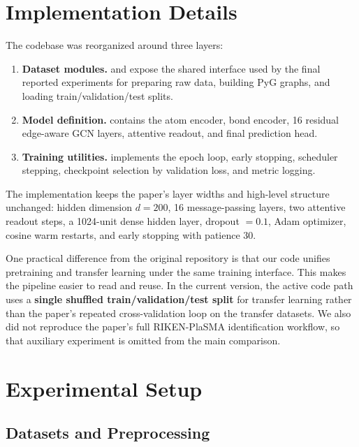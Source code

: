 \section{Implementation Details}

The codebase was reorganized around three layers:

\begin{enumerate}
    \item \textbf{Dataset modules.}  and  expose the shared interface used by the final reported experiments for preparing raw data, building PyG graphs, and loading train/validation/test splits.
    \item \textbf{Model definition.}  contains the atom encoder, bond encoder, 16 residual edge-aware GCN layers, attentive readout, and final prediction head.
    \item \textbf{Training utilities.}  implements the epoch loop, early stopping, scheduler stepping, checkpoint selection by validation loss, and metric logging.
\end{enumerate}

The implementation keeps the paper's layer widths and high-level structure unchanged: hidden dimension \(d=200\), 16 message-passing layers, two attentive readout steps, a 1024-unit dense hidden layer, dropout \(=0.1\), Adam optimizer, cosine warm restarts, and early stopping with patience 30.

One practical difference from the original repository is that our code unifies pretraining and transfer learning under the same training interface. This makes the pipeline easier to read and reuse. In the current version, the active code path uses a \textbf{single shuffled train/validation/test split} for transfer learning rather than the paper's repeated cross-validation loop on the transfer datasets. We also did not reproduce the paper's full RIKEN-PlaSMA identification workflow, so that auxiliary experiment is omitted from the main comparison.

\section{Experimental Setup}

\subsection{Datasets and Preprocessing}

